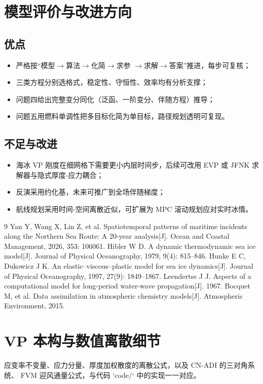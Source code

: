\documentclass[12pt]{ctexart}
\begin{document}
\section{模型评价与改进方向}
\subsection{优点}
\begin{itemize}
	\item 严格按“模型$\rightarrow$算法$\rightarrow$化简$\rightarrow$求参
	$\rightarrow$求解$\rightarrow$答案”推进，每步可复核；
	\item 三类方程分别选格式，稳定性、守恒性、效率均有分析支撑；
	\item 问题四给出完整变分同化（泛函、一阶变分、伴随方程）推导；
	\item 问题五用燃料单调性把多目标化简为单目标，路径规划透明可复现。
\end{itemize}
\subsection{不足与改进}
\begin{itemize}
	\item 海冰 VP 刚度在细网格下需要更小内层时间步，后续可改用 EVP 或
	JFNK 求解器与隐式厚度-应力耦合；
	\item 反演采用约化基，未来可推广到全场伴随梯度；
	\item 航线规划采用时间-空间离散近似，可扩展为 MPC 滚动规划应对实时冰情。
\end{itemize}

\begin{thebibliography}{9}
 Yan Y, Wang X, Lin Z, et al. Spatiotemporal patterns of maritime
incidents along the Northern Sea Route: A 20-year analysis[J]. Ocean and Coastal
Management, 2026, 353: 106061.
 Hibler W D. A dynamic thermodynamic sea ice model[J].
Journal of Physical Oceanography, 1979, 9(4): 815--846.
 Hunke E C, Dukowicz J K. An elastic--viscous--plastic model for
sea ice dynamics[J]. Journal of Physical Oceanography, 1997, 27(9): 1849--1867.
 Leendertse J J. Aspects of a computational model for
long-period water-wave propagation[J]. 1967.
 Bocquet M, et al. Data assimilation in atmospheric chemistry
models[J]. Atmospheric Environment, 2015.
\end{thebibliography}

\appendix
\section{VP 本构与数值离散细节}
应变率不变量、应力分量、厚度加权散度的离散公式，以及 CN-ADI 的三对角系统、
FVM 迎风通量公式，与代码 `code/` 中的实现一一对应。
\end{document}
